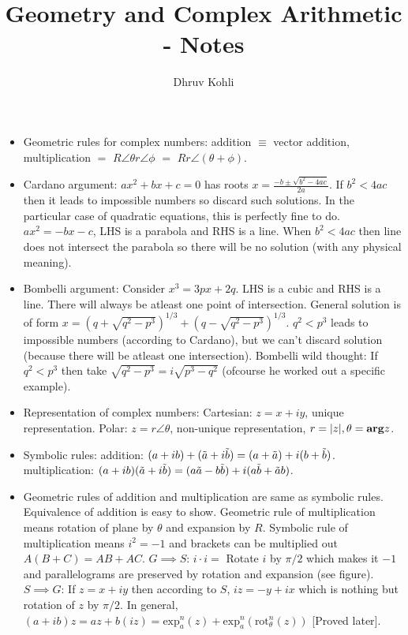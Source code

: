 \documentclass[12pt]{article}
\def\mf{\ensuremath\mathbf}
\def\td{\ensuremath\tilde}
\def\arg{\ensuremath\mf{arg}}
\begin{document}
    
\title{Geometry and Complex Arithmetic - Notes}
\author{Dhruv Kohli}
\maketitle
\begin{itemize}
    \item Geometric rules for complex numbers: addition $\equiv$ vector addition, multiplication $=$ $R\angle \theta r\angle\phi$ $=$ $Rr\angle (\theta+\phi)$.
    \item Cardano argument: $ax^2+bx+c=0$ has roots $x = \frac{-b\pm\sqrt{b^2-4ac}}{2a}$. If $b^2<4ac$ then it leads to impossible numbers so discard such solutions. In the particular case of quadratic equations, this is perfectly fine to do. $ax^2=-bx-c$, LHS is a parabola and RHS is a line. When $b^2<4ac$ then line does not intersect the parabola so there will be no solution (with any physical meaning).
    \item Bombelli argument: Consider $x^3 = 3px+2q$. LHS is a cubic and RHS is a line. There will always be atleast one point of intersection. General solution is of form $x = (q+\sqrt{q^2-p^3})^{1/3} + (q-\sqrt{q^2-p^3})^{1/3}$. $q^2<p^3$ leads to impossible numbers (according to Cardano), but we can't discard solution (because there will be atleast one intersection). Bombelli wild thought: If $q^2<p^3$ then take $\sqrt{q^2-p^3}=i\sqrt{p^3-q^2}$ (ofcourse he worked out a specific example).
    \item Representation of complex numbers: Cartesian: $z=x+iy$, unique representation. Polar: $z=r\angle\theta$, non-unique representation, $r=|z|, \theta = \arg z$.
    \item Symbolic rules: addition: $(a+ib)+(\td{a}+i\td{b}) = (a+\td{a})+i(b+\td{b})$. multiplication: $(a+ib)(\td{a}+i\td{b}) = (a\td{a}-b\td{b}) +i (a\td{b}+\td{a}b)$.
    \item Geometric rules of addition and multiplication are same as symbolic rules. Equivalence of addition is easy to show. Geometric rule of multiplication means rotation of plane by $\theta$ and expansion by $R$. Symbolic rule of multiplication means $i^2=-1$ and brackets can be multiplied out $A(B+C)=AB+AC$. $G \implies S$: $i\cdot i = $ Rotate $i$ by $\pi/2$ which makes it $-1$ and parallelograms are preserved by rotation and expansion (see figure). $S \implies G$: If $z=x+iy$ then according to $S$, $iz = -y+ix$ which is nothing but rotation of $z$ by $\pi/2$. In general, $(a+ib)z = az + b(iz) = \text{exp}^{n}_{a}(z) + \text{exp}^{n}_{a}(\text{rot}^{n}_{\theta}(z))$ [Proved later].

\end{itemize}
\end{document}
